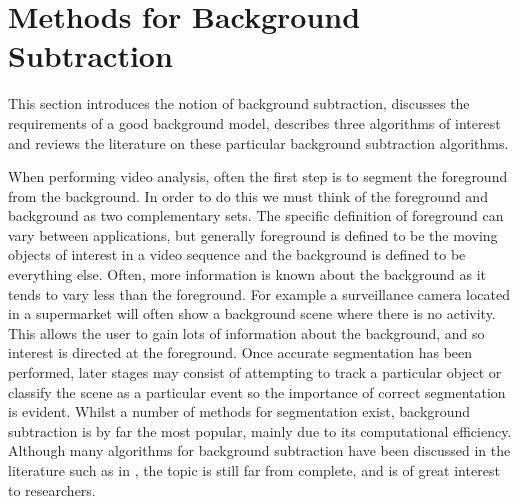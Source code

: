 %							

%								
\graphicspath{{Appendix/figures_A/}} 


\chapter{Methods for Background Subtraction}
\label{chap:ap_A}

This section introduces the notion of background subtraction, discusses the requirements of a good background model, describes three algorithms of interest and reviews the literature on these particular background subtraction algorithms.

When performing video analysis, often the first step is to segment the foreground from the background. In order to do this we must think of the foreground and background as two complementary sets. The specific definition of foreground can vary between applications, but generally foreground is defined to be the moving objects of interest in a video sequence and the background is defined to be everything else. Often, more information is known about the background as it tends to vary less than the foreground. For example a surveillance camera located in a supermarket will often show a background scene where there is no activity. This allows the user to gain lots of information about the background, and so interest is directed at the foreground. Once accurate segmentation has been performed, later stages may consist of attempting to track a particular object or classify the scene as a particular event so the importance of correct segmentation is evident. Whilst a number of methods for segmentation exist, background subtraction is by far the most popular, mainly due to its computational efficiency. Although many algorithms for background subtraction have been discussed in the literature such as in \cite{sen2004robust}, the topic is still far from complete, and is of great interest to researchers. 


